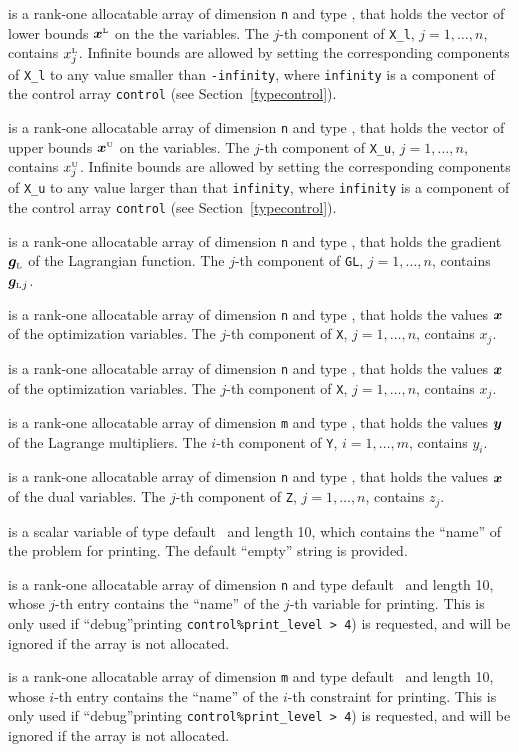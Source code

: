 \documentclass{galahad}
\newcommand{\sL}{\s{L}}
\newcommand{\sU}{\s{U}}
\newcommand{\bmgL}{\bmg\sub{L}}
\begin{document}
\begin{description}
 is a rank-one allocatable array of dimension {\tt n} and type
\realdp, that holds
the vector of lower bounds $\bmx\sL$ on the the variables.
The $j$-th component of {\tt X\_l}, $j = 1, \ldots , n$,
contains $x_{j}\sL$.
Infinite bounds are allowed by setting the corresponding
components of {\tt X\_l} to any value smaller than {\tt -infinity},
where {\tt infinity} is a component of the control array {\tt control}
(see Section~\ref{typecontrol}).

 is a rank-one allocatable array of dimension {\tt n} and type
\realdp, that holds
the vector of upper bounds $\bmx\sU$ on the variables.
The $j$-th component of {\tt X\_u}, $j = 1, \ldots , n$,
contains $x_{j}\sU$.
Infinite bounds are allowed by setting the corresponding
components of {\tt X\_u} to any value larger than that {\tt infinity},
where {\tt infinity} is a component of the control array {\tt control}
(see Section~\ref{typecontrol}).

 is a rank-one allocatable array of dimension {\tt n} and type
\realdp, that holds the gradient $\bmgL$ of the Lagrangian function.
The $j$-th component of {\tt GL}, $j = 1,  \ldots ,  n$, contains $\bmgL{}_{j}$.

 is a rank-one allocatable array of dimension {\tt n} and type
\realdp, that holds the values ${\bm{x}}$ of the optimization variables.
The $j$-th component of {\tt X}, $j = 1,  \ldots , n$, contains $x_{j}$.

 is a rank-one allocatable array of dimension {\tt n} and type
\realdp, that holds the values ${\bm{x}}$ of the optimization variables.
The $j$-th component of {\tt X}, $j = 1,  \ldots , n$, contains $x_{j}$.

 is a rank-one allocatable array of dimension {\tt m} and type
\realdp, that holds the values ${\bm{y}}$ of the Lagrange multipliers.
The $i$-th component of {\tt Y}, $i = 1,  \ldots , m$, contains $y_{i}$.

 is a rank-one allocatable array of dimension {\tt n} and type
\realdp, that holds the values ${\bm{x}}$ of the dual variables.
The $j$-th component of {\tt Z}, $j = 1,  \ldots , n$, contains $z_{j}$.

 is a scalar variable of type
default \character\ and length 10, which contains the
``name'' of the problem for printing. The default ``empty'' string is
provided.

 is a rank-one allocatable array of dimension {\tt n} and type
default \character\ and length 10, whose $j$-th entry contains the
``name'' of the $j$-th variable for printing. This is only used
if ``debug''printing {\tt control\%print\_level > 4}) is requested,
and will be ignored if the array is not allocated.

 is a rank-one allocatable array of dimension {\tt m} and type
default \character\ and length 10, whose $i$-th entry contains the
``name'' of the $i$-th constraint for printing. This is only used
if ``debug''printing {\tt control\%print\_level > 4}) is requested,
and will be ignored if the array is not allocated.

\end{description}
\end{document}
